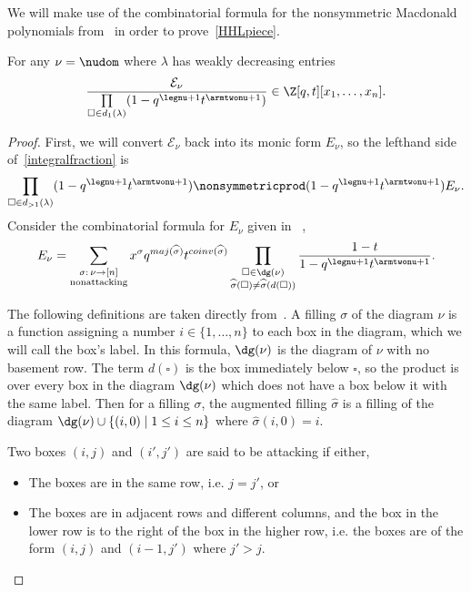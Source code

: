 We will make use of the combinatorial formula for the nonsymmetric Macdonald polynomials from~\cite{MR2405160} in order to prove~\eqref{HHLpiece}.
\begin{lemm}\label{redundancy} For any $\nu = \nudom$ where $\lambda$ has weakly decreasing entries 
\begin{equation}\label{integralfraction} \frac{\mathcal{E}_\nu}{\prod\limits_{ \square \in d_1(\lambda) }(1-q^{\legnu+1}t^{\armtwonu +1})} \in \Z[q,t][x_1, \dotsc, x_n]. \end{equation}
\end{lemm}
\begin{proof}
First, we will convert $\mathcal{E}_\nu$ back into its monic form $E_\nu$, so the lefthand side of~\eqref{integralfraction} is
\[\prod\limits_{\square \in d_{>1}(\lambda) }(1-q^{\legnu+1}t^{\armtwonu + 1}) \nonsymmetricprod(1-q^{\legnu+1}t^{\armtwonu + 1}) E_\nu.\]
Consider the combinatorial formula for $E_\nu$ given in ~\cite{MR2405160},
\[E_\nu = \sum\limits_{\substack{\sigma :\, \nu \to [n] \\ \text{nonattacking}}} x^\sigma q^{maj(\widehat{\sigma})}t^{coinv(\widehat{\sigma})} \prod\limits_{\substack{\square \in  \dg(\nu) \\ \widehat{\sigma}(\square) \neq \widehat{\sigma}(d(\square))}} \frac{1-t}{1-q^{\legnu+1} t^{\armtwonu+1}}.\]

The following definitions are taken directly from~\cite{MR2405160}. A filling $\sigma$ of the diagram $\nu$ is a function assigning a number $i\in \{1, \dotsc, n \} $ to each box in the diagram, which we will call the box's label. In this formula, $\dg(\nu)$ is the diagram of $\nu$ with no basement row. The term $d(\square)$ is the box immediately below $\square$, so the product is over every box in the diagram $\dg(\nu)$ which does not have a box below it with the same label. Then for a filling $\sigma$, the augmented filling $\widehat{\sigma}$ is a filling of the diagram $\dg(\nu) \cup \{ (i,0) \mid 1\leq i \leq n\}$ where $\widehat{\sigma}(i,0)=i$.

Two boxes $(i,j)$ and $(i',j')$ are said to be attacking if either,
\begin{itemize}
    \item The boxes are in the same row, i.e. $j = j'$, or
    \item The boxes are in adjacent rows and different columns, and the box in the lower row is to the right of the box in the higher row, i.e. the boxes are of the form $(i,j)$ and $(i-1,j')$ where $j' > j$.
\end{itemize}


\end{proof}
